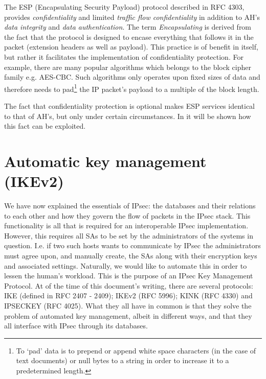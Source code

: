 \documentclass[final,a4paper,twoside,11pt,onecolumn]{report}
\begin{document}
The ESP (Encapsulating Security Payload) protocol described in RFC 4303\cite{rfc4303}, provides \emph{confidentiality} and limited \emph{traffic flow confidentiality} in addition to AH's \emph{data integrity} and \emph{data authentication}. The term \emph{Encapsulating} is derived from the fact that the protocol is designed to encase everything that follows it in the packet (extension headers as well as payload). This practice is of benefit in itself, but rather it facilitates the implementation of confidentiality protection. For example, there are many popular algorithms which belongs to the block cipher family e.g. AES-CBC. Such algorithms only operates upon fixed sizes of data and therefore needs to pad\footnote{To `pad' data is to prepend or append white space characters (in the case of text documents) or null bytes to a string in order to increase it to a predetermined length.} the IP packet's payload to a multiple of the block length.

The fact that confidentiality protection is optional makes ESP services identical to that of AH's, but only under certain circumstances. In  it will be shown how this fact can be exploited.


% 
% 

\label{sec:ikebg}
\section{Automatic key management (IKEv2)}%
We have now explained the essentials of IPsec: the databases and their relations to each other and how they govern the flow of packets in the IPsec stack. This functionality is all that is required for an interoperable IPsec implementation. However, this requires all SAs to be set by the administrators of the systems in question. I.e. if two such hosts wants to communicate by IPsec the administrators must agree upon, and manually create, the SAs along with their encryption keys and associated settings. Naturally, we would like to automate this in order to lessen the human's workload. This is the purpose of an IPsec Key Management Protocol. At of the time of this document's writing, there are several protocols: IKE (defined in RFC 2407 - 2409)\cite{rfc2407}\cite{rfc2408}\cite{rfc2409}; IKEv2 (RFC 5996)\cite{rfc5996}; KINK (RFC 4330)\cite{rfc4330} and IPSECKEY (RFC 4025)\cite{rfc4025}. What they all have in common is that they solve the problem of automated key management, albeit in different ways, and that they all interface with IPsec through its databases.
\end{document}
